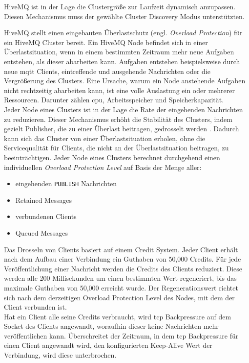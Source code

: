 HiveMQ ist in der Lage die Clustergrö{\ss}e zur Laufzeit dynamisch anzupassen. Diesen Mechanismus muss der gewählte Cluster Discovery Modus unterstützten.
\cite{HiveMQClusterHiveMQ}

 \label{sb:overload-protection}
HiveMQ stellt einen eingebauten Überlastschutz (engl. \textit{Overload Protection}) für ein HiveMQ Cluster bereit.
Ein HiveMQ Node befindet sich in einer Überlastsituation, wenn in einem bestimmten Zeitraum mehr neue Aufgaben entstehen, als dieser abarbeiten kann. Aufgaben entstehen beispielsweise durch neue \ac{mqtt} Clients, eintreffende und ausgehende Nachrichten oder die Vergrö{\ss}erung des Clusters.
Eine Ursache, warum ein Node anstehende Aufgaben nicht rechtzeitig abarbeiten kann, ist eine volle Auslastung ein oder mehrerer Ressourcen. Darunter zählen \ac{cpu}, Arbeitsspeicher und Speicherkapazität.
\\
Jeder Node eines Clusters ist in der Lage die Rate der eingehenden Nachrichten zu reduzieren. Dieser Mechanismus erhöht die Stabilität des Clusters, indem gezielt Publisher, die zu einer Überlast beitragen, gedrosselt werden \cite{ClusterOverloadProtection}.
Dadurch kann sich das Cluster von einer Überlastsituation erholen, ohne die Servicequalität für Clients, die nicht an der Überlastsituation beitragen, zu beeinträchtigen.
Jeder Node eines Clusters berechnet durchgehend einen individuellen \textit{Overload Protection Level} auf Basis der Menge aller:
\begin{itemize}
    \item eingehenden \verb|PUBLISH| Nachrichten
    \item Retained Messages
    \item verbundenen Clients
    \item Queued Messages
\end{itemize}
Das Drosseln von Clients basiert auf einem Credit System. Jeder Client erhält nach dem Aufbau einer Verbindung ein Guthaben von 50,000 Credits.
Für jede Veröffentlichung einer Nachricht werden die Credits des Clients reduziert.
Diese werden alle 200 Millisekunden um einen bestimmten Wert regeneriert, bis das maximale Guthaben von 50,000 erreicht wurde. Der Regenerationswert richtet sich nach dem derzeitigen Overload Protection Level des Nodes, mit dem der Client verbunden ist.
\cite{ClusterOverloadProtection}
\\
Hat ein Client alle seine Credits verbraucht, wird \ac{tcp} Backpressure auf dem Socket des Clients angewandt, woraufhin dieser keine Nachrichten mehr veröffentlichen kann.
Überschreitet der Zeitraum, in dem \ac{tcp} Backpressure für einen Client angewandt wird, den konfigurierten Keep-Alive Wert der Verbindung, wird diese unterbrochen.
\cite{ClusterOverloadProtection}

